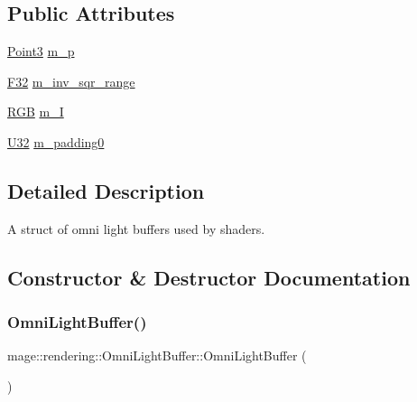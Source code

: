 \subsection*{Public Attributes}
\begin{DoxyCompactItemize}
\item 
\mbox{\hyperlink{structmage_1_1_point3}{Point3}} \mbox{\hyperlink{structmage_1_1rendering_1_1_omni_light_buffer_aab9cd7c4702a9cba7b47ec49983658d7}{m\+\_\+p}}
\item 
\mbox{\hyperlink{namespacemage_aa97e833b45f06d60a0a9c4fc22ae02c0}{F32}} \mbox{\hyperlink{structmage_1_1rendering_1_1_omni_light_buffer_ac6a0b6050b8d705d46f72ed115b28c4a}{m\+\_\+inv\+\_\+sqr\+\_\+range}}
\item 
\mbox{\hyperlink{structmage_1_1_r_g_b}{R\+GB}} \mbox{\hyperlink{structmage_1_1rendering_1_1_omni_light_buffer_a01b8cc152dd0ea2b961448ad3057a5d0}{m\+\_\+I}}
\item 
\mbox{\hyperlink{namespacemage_a41c104c036fba3756a74e19f793eeaa1}{U32}} \mbox{\hyperlink{structmage_1_1rendering_1_1_omni_light_buffer_a3b440492e1a9fc48c6f109e5787aa4c7}{m\+\_\+padding0}}
\end{DoxyCompactItemize}


\subsection{Detailed Description}
A struct of omni light buffers used by shaders. 

\subsection{Constructor \& Destructor Documentation}
\mbox{\label{structmage_1_1rendering_1_1_omni_light_buffer_a7429503e161d324c66ecad2250bc69a2}} 
\subsubsection{\texorpdfstring{Omni\+Light\+Buffer()}{OmniLightBuffer()}\hspace{0.1cm}{\footnotesize\ttfamily [1/3]}}
{\footnotesize\ttfamily mage\+::rendering\+::\+Omni\+Light\+Buffer\+::\+Omni\+Light\+Buffer (\begin{DoxyParamCaption}{ }\end{DoxyParamCaption})\hspace{0.3cm}{\ttfamily [noexcept]}}

